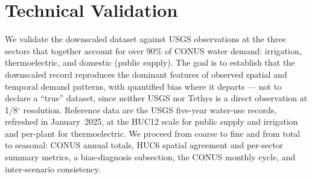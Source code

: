 \documentclass[fleqn,10pt]{wlscirep}
\begin{document}
\section*{Technical Validation}

We validate the downscaled dataset against USGS observations at the three sectors that together account for over 90\% of CONUS water demand: irrigation, thermoelectric, and domestic (public supply)\cite{skinnerWaterWithdrawalConsumption2025}. The goal is to establish that the downscaled record reproduces the dominant features of observed spatial and temporal demand patterns, with quantified bias where it departs --- not to declare a ``true'' dataset, since neither USGS nor Tethys is a direct observation at 1/8$^{\circ}$ resolution. Reference data are the USGS five-year water-use records, refreshed in January~2025, at the HUC12 scale for public supply and irrigation and per-plant for thermoelectric. We proceed from coarse to fine and from total to seasonal: CONUS annual totals, HUC6 spatial agreement and per-sector summary metrics, a bias-diagnosis subsection, the CONUS monthly cycle, and inter-scenario consistency.
\end{document}
